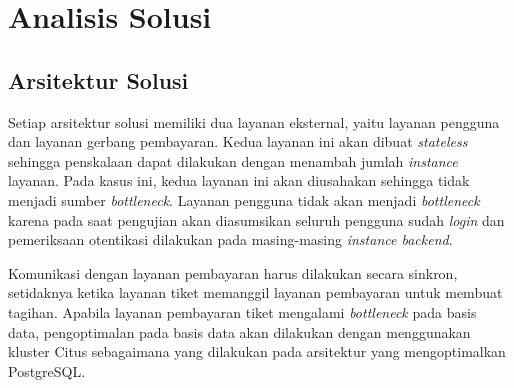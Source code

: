 \chapter{Analisis Solusi}

\section{Arsitektur Solusi}

Setiap arsitektur solusi memiliki dua layanan eksternal, yaitu layanan pengguna dan layanan gerbang pembayaran. Kedua layanan ini akan dibuat \textit{stateless} sehingga penskalaan dapat dilakukan dengan menambah jumlah \textit{instance} layanan. Pada kasus ini, kedua layanan ini akan diusahakan sehingga tidak menjadi sumber \textit{bottleneck}. Layanan pengguna tidak akan menjadi \textit{bottleneck} karena pada saat pengujian akan diasumsikan seluruh pengguna sudah \textit{login} dan pemeriksaan otentikasi dilakukan pada masing-masing \textit{instance backend}.

Komunikasi dengan layanan pembayaran harus dilakukan secara sinkron, setidaknya ketika layanan tiket memanggil layanan pembayaran untuk membuat tagihan. Apabila layanan pembayaran tiket mengalami \textit{bottleneck} pada basis data, pengoptimalan pada basis data akan dilakukan dengan menggunakan kluster Citus sebagaimana yang dilakukan pada arsitektur yang mengoptimalkan PostgreSQL.






